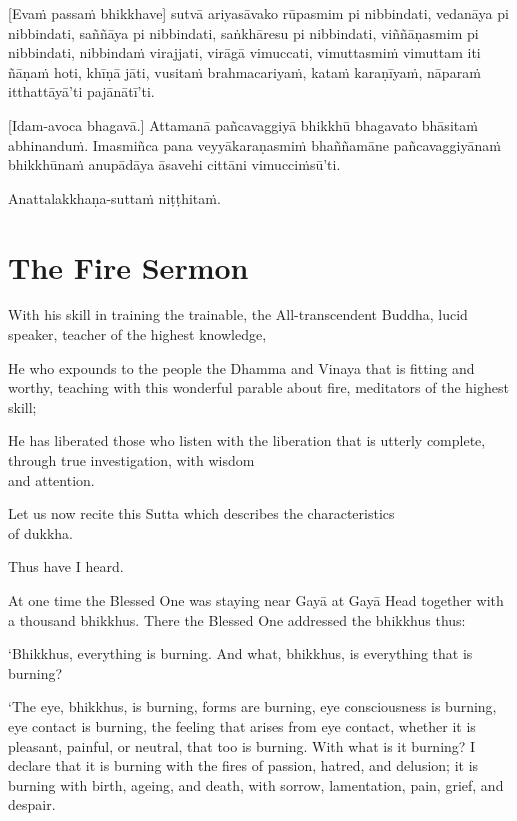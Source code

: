[Evaṁ passaṁ bhikkhave] sutvā ariyasāvako rūpasmim pi nibbindati, vedanāya
pi nibbindati, saññāya pi nibbindati, saṅkhāresu pi nibbindati,
viññāṇasmim pi nibbindati, nibbindaṁ virajjati, virāgā vimuccati,
vimuttasmiṁ vimuttam iti ñāṇaṁ hoti, khīṇā jāti, vusitaṁ brahmacariyaṁ,
kataṁ karaṇīyaṁ, nāparaṁ itthattāyā'ti pajānātī'ti.

[Idam-avoca bhagavā.] Attamanā pañcavaggiyā bhikkhū bhagavato bhāsitaṁ
abhinanduṁ. Imasmiñca pana veyyākaraṇasmiṁ bhaññamāne pañcavaggiyānaṁ
bhikkhūnaṁ anupādāya āsavehi cittāni vimucciṁsū'ti.

Anattalakkhaṇa-suttaṁ niṭṭhitaṁ.

\chapterTocDelegatePageNumber
\chapter{The Fire Sermon}

\setTocDelegatedPageNumber
\englishText
\renewcommand{\englishTitle}{The Fire Sermon}

\begin{leader}

With his skill in training the trainable, the All-transcendent Buddha,
lucid speaker, teacher of the highest knowledge,

He who expounds to the people the Dhamma and Vinaya that is fitting and
worthy, teaching with this wonderful parable about fire, meditators of
the highest skill;

He has liberated those who listen with the liberation that is utterly
complete, through true investigation, with wisdom\\ and attention.

Let us now recite this Sutta which describes the characteristics\\ of dukkha.

\end{leader}

Thus have I heard.

At one time the Blessed One was staying near Gayā at Gayā Head together
with a thousand bhikkhus. There the Blessed One addressed the bhikkhus
thus:

‘Bhikkhus, everything is burning. And what, bhikkhus, is everything
that is burning?

‘The eye, bhikkhus, is burning, forms are burning, eye consciousness is
burning, eye contact is burning, the feeling that arises from eye
contact, whether it is pleasant, painful, or neutral, that too is
burning. With what is it burning? I declare that it is burning with the
fires of passion, hatred, and delusion; it is burning with birth,
ageing, and death, with sorrow, lamentation, pain, grief, and despair.

